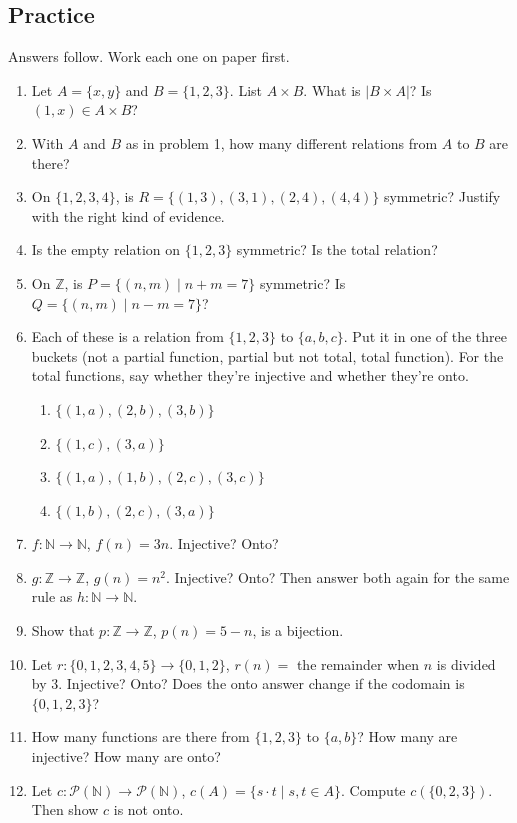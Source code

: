 \subsection{Practice}

Answers follow. Work each one on paper first.

\begin{enumerate}
\item Let $A=\{x,y\}$ and $B=\{1,2,3\}$. List $A\times B$. What is $|B\times A|$? Is $(1,x)\in A\times B$?
\item With $A$ and $B$ as in problem 1, how many different relations from $A$ to $B$ are there?
\item On $\{1,2,3,4\}$, is $R=\{(1,3),(3,1),(2,4),(4,4)\}$ symmetric? Justify with the right kind of evidence.
\item Is the empty relation on $\{1,2,3\}$ symmetric? Is the total relation?
\item On $\mathbb{Z}$, is $P=\{(n,m)\mid n+m=7\}$ symmetric? Is $Q=\{(n,m)\mid n-m=7\}$?
\item Each of these is a relation from $\{1,2,3\}$ to $\{a,b,c\}$. Put it in one of the three buckets (not a partial function, partial but not total, total function). For the total functions, say whether they're injective and whether they're onto.
\begin{enumerate}
\item $\{(1,a),(2,b),(3,b)\}$
\item $\{(1,c),(3,a)\}$
\item $\{(1,a),(1,b),(2,c),(3,c)\}$
\item $\{(1,b),(2,c),(3,a)\}$
\end{enumerate}
\item $f:\mathbb{N}\to\mathbb{N}$, $f(n)=3n$. Injective? Onto?
\item $g:\mathbb{Z}\to\mathbb{Z}$, $g(n)=n^2$. Injective? Onto? Then answer both again for the same rule as $h:\mathbb{N}\to\mathbb{N}$.
\item Show that $p:\mathbb{Z}\to\mathbb{Z}$, $p(n)=5-n$, is a bijection.
\item Let $r:\{0,1,2,3,4,5\}\to\{0,1,2\}$, $r(n)=$ the remainder when $n$ is divided by $3$. Injective? Onto? Does the onto answer change if the codomain is $\{0,1,2,3\}$?
\item How many functions are there from $\{1,2,3\}$ to $\{a,b\}$? How many are injective? How many are onto?
\item Let $c:\mathcal{P}(\mathbb{N})\to\mathcal{P}(\mathbb{N})$, $c(A)=\{s\cdot t\mid s,t\in A\}$. Compute $c(\{0,2,3\})$. Then show $c$ is not onto.
\end{enumerate}

